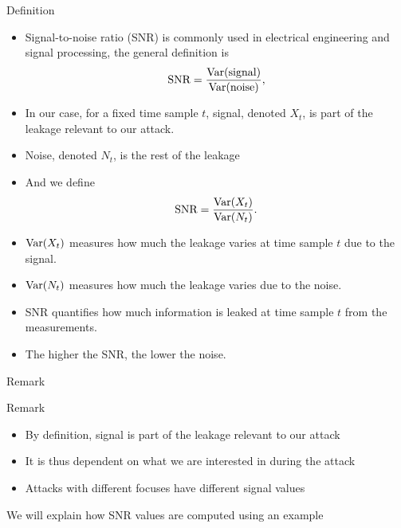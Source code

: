 \begin{frame}{Definition}
    \begin{itemize}
        \item Signal-to-noise ratio (SNR) is commonly used in electrical engineering and signal processing, the general definition is
\[
\text{SNR}=\frac{\textrm{Var}{\left(\text{signal}\right)}}{\textrm{Var}{\left(\text{noise}\right)}},
\]
\item In our case, for a fixed time sample $t$, signal, denoted $X_t$, is part of the leakage relevant to our attack.
\item Noise, denoted $N_t$, is the rest of the leakage
\item And we define
\begin{equation*}
    \text{SNR}=\frac{\textrm{Var}{\left(X_t\right)}}{\textrm{Var}{\left(N_t\right)}}.
\end{equation*}
\item $\textrm{Var}{\left(X_t\right)}$ measures how much the leakage varies at time sample $t$ due to the signal.
\item $\textrm{Var}{\left(N_t\right)}$ measures how much the leakage varies due to the noise.
\item SNR quantifies how much information is leaked at time sample $t$ from the measurements.
\item The higher the SNR, the lower the noise.
    \end{itemize}
\end{frame}

\begin{frame}{Remark}
\begin{alertblock}{Remark}
    \begin{itemize}
        \item By definition, signal is part of the leakage relevant to our attack
        \item It is thus dependent on what we are interested in during the attack
        \item Attacks with different focuses have different signal values
    \end{itemize}
\end{alertblock}
We will explain how SNR values are computed using an example
\end{frame}

